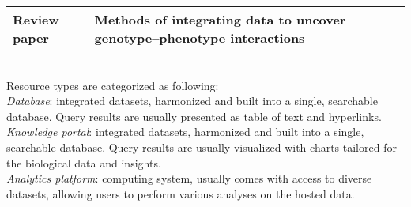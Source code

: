 \documentclass[12pt,letter]{article}
\begin{document}
\begin{landscape}
\begin{table}[]
\begin{tabular}{lp{8cm}ll}
			Review paper       & \multicolumn{2}{l|}{Methods of integrating data to uncover genotype–phenotype interactions} & \cite{Ritchie:2015:Methods}           \\ \hline
		\end{tabular}	\\ \newline
	\footnotesize{Resource types are categorized as following:\\
\textit{Database}: integrated datasets, harmonized and built into a single, searchable database. Query results are usually presented as table of text and hyperlinks.
\\
\textit{Knowledge portal}: integrated datasets, harmonized and built into a single, searchable database. Query results are usually visualized with charts tailored for the biological data and insights.
\\
\textit{Analytics platform}: computing system, usually comes with access to diverse datasets, allowing users to perform various analyses on the hosted data.	
}
	\end{table}
\end{landscape}



\end{document}
